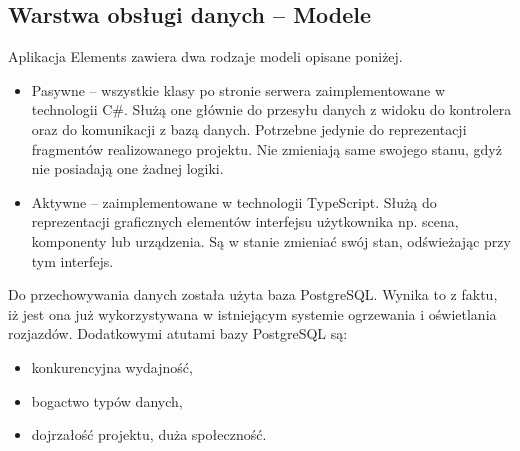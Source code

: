 \subsection{Warstwa obsługi danych -- Modele}
Aplikacja Elements zawiera dwa rodzaje modeli opisane poniżej.
\begin{itemize}
\item Pasywne -- wszystkie klasy po stronie serwera zaimplementowane w technologii C\#. Służą one głównie do przesyłu danych z widoku do kontrolera oraz do komunikacji z bazą danych. Potrzebne jedynie do reprezentacji fragmentów realizowanego projektu. Nie zmieniają same swojego stanu, gdyż nie posiadają one żadnej logiki. 
\item Aktywne -- zaimplementowane w technologii TypeScript. Służą do reprezentacji graficznych elementów interfejsu użytkownika np. scena, komponenty lub urządzenia. Są w stanie zmieniać swój stan, odświeżając przy tym interfejs.
\end{itemize}

Do przechowywania danych została użyta baza PostgreSQL. Wynika to z faktu, iż jest ona już wykorzystywana w istniejącym systemie ogrzewania i oświetlania rozjazdów. Dodatkowymi atutami bazy PostgreSQL są: \cite{postgresql-book}
\begin{itemize}
\item konkurencyjna wydajność,
\item bogactwo typów danych,
\item dojrzałość projektu, duża społeczność.
\end{itemize}

